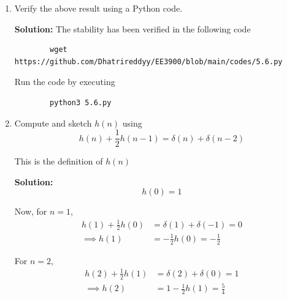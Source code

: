 \documentclass[journal,12pt,twocolumn]{IEEEtran}
\newcommand{\solution}{\noindent \textbf{Solution: }}
\providecommand{\brak}[1]{\ensuremath{\left(#1\right)}}
\numberwithin{equation}{section}
\renewcommand\thesection{\arabic{section}}
\begin{document}
\begin{enumerate}[label=\thesection.\arabic*]
	\solution
	\begin{multline}
		\sum_{n=-\infty}^{\infty}h(n) = \sum_{n=-\infty}^{\infty} \brak{-\frac12}^n u(n) \\
		+ \sum_{n=-\infty}^{\infty} \brak{-\frac12}^{n-2} u(n-2)
	\end{multline}
	\begin{align}
		\sum_{n=-\infty}^{\infty}h(n) = \sum_{n=0}^{\infty}\brak{-\frac12}^n + \sum_{n=2}^{\infty}\brak{-\frac12}^{n-2}
	\end{align}
	
	These are both sums of infinite geometric progressions with first terms $1$ and common ratios $-\frac12$
	\begin{align}
		\sum_{n=-\infty}^{\infty}h(n) &= \frac{1}{1 - \brak{-\frac12}} + \frac{1}{1 - \brak{-\frac12}} \\
		&= \frac{4}{3} < \infty
	\end{align}
	
	Therefore, the system is stable. 
	
	\item Verify the above result using a Python code. 
	
	\solution The stability has been verified in the following code
	\begin{lstlisting}
		wget https://github.com/Dhatrireddyy/EE3900/blob/main/codes/5.6.py
	\end{lstlisting}
	
	Run the code by executing
	\begin{lstlisting}
		python3 5.6.py
	\end{lstlisting}
	
	\item Compute and sketch $h(n)$ using 
	\begin{equation}
		\label{eq:iir_filter_h}
		h(n) + \frac{1}{2}h(n-1) = \delta(n) + \delta(n-2)
	\end{equation}

	This is the definition of $h(n)$
	
	\solution 
	\begin{equation}
		h(0) = 1
	\end{equation}
	
	Now, for $n = 1$,
	\begin{align}
		h(1) + \frac12 h(0) &= \delta(1) + \delta(-1) = 0 \\
		\implies h(1) &= - \frac{1}{2} h(0) = -\frac{1}{2}
	\end{align}
	
	For $n = 2$,
	\begin{align}
		h(2) + \frac12 h(1) &= \delta(2) + \delta(0) = 1 \\
		\implies h(2) &= 1 - \frac{1}{2} h(1) = \frac{5}{4}
	\end{align}
	

\end{enumerate}
\end{document}
